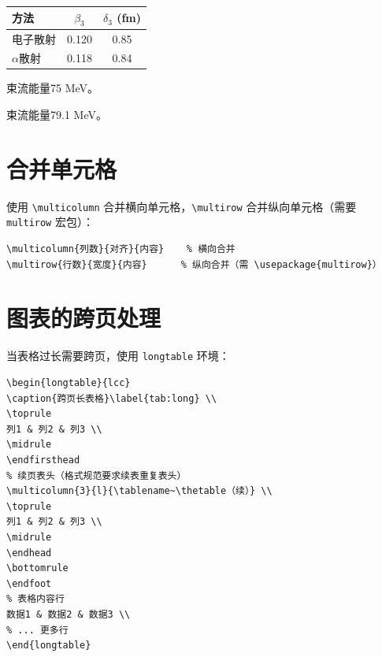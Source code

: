 \begin{table}[H]
\centering
{}
\begin{threeparttable}
\begin{tabular}{lcc}
\toprule
方法 & $\beta_3$ & $\delta_3$ (fm) \\
\midrule
电子散射\tnote{$a$} & 0.120 & 0.85 \\
$\alpha$散射\tnote{$b$} & 0.118 & 0.84 \\
\bottomrule
\end{tabular}
\begin{tablenotes}
    \item[$a$] 束流能量75 MeV。
    \item[$b$] 束流能量79.1 MeV。
\end{tablenotes}
\end{threeparttable}
\end{table}

\section{合并单元格}

使用 \verb|\multicolumn| 合并横向单元格，\verb|\multirow| 合并纵向单元格（需要 \texttt{multirow} 宏包）：

\begin{verbatim}
\multicolumn{列数}{对齐}{内容}    % 横向合并
\multirow{行数}{宽度}{内容}      % 纵向合并（需 \usepackage{multirow}）
\end{verbatim}

\section{图表的跨页处理}

当表格过长需要跨页，使用 \texttt{longtable} 环境：

\begin{verbatim}
\begin{longtable}{lcc}
\caption{跨页长表格}\label{tab:long} \\
\toprule
列1 & 列2 & 列3 \\
\midrule
\endfirsthead
% 续页表头（格式规范要求续表重复表头）
\multicolumn{3}{l}{\tablename~\thetable（续）} \\
\toprule
列1 & 列2 & 列3 \\
\midrule
\endhead
\bottomrule
\endfoot
% 表格内容行
数据1 & 数据2 & 数据3 \\
% ... 更多行
\end{longtable}
\end{verbatim}

